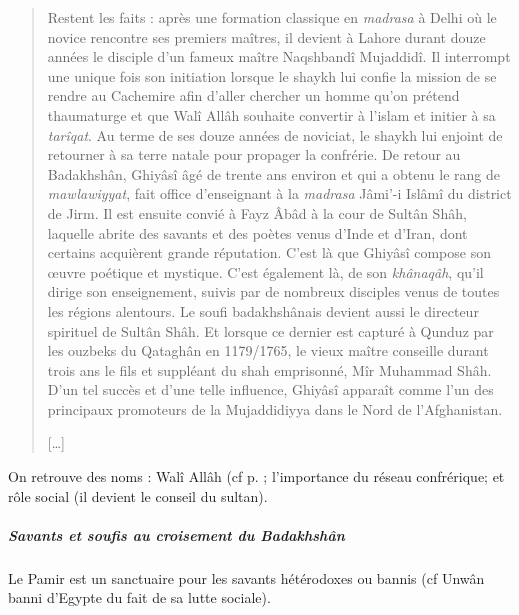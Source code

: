 \begin{quote}
 
Restent les faits : après une formation classique en \emph{madrasa} à
Delhi où le novice rencontre ses premiers maîtres, il devient à Lahore
durant douze années le disciple d'un fameux maître Naqshbandî Mujaddidî.
Il interrompt une unique fois son initiation lorsque le shaykh lui
confie la mission de se rendre au Cachemire afin d'aller chercher un
homme qu'on prétend thaumaturge et que Walî Allâh souhaite convertir à
l'islam et initier à sa \emph{tarîqat}. Au terme de ses douze années de
noviciat, le shaykh lui enjoint de retourner à sa terre natale pour
propager la confrérie. De retour au Badakhshân, Ghiyâsî âgé de trente
ans environ et qui a obtenu le rang de \emph{mawlawiyyat}, fait office
d'enseignant à la \emph{madrasa} Jâmi'-i Islâmî du district de Jirm. Il
est ensuite convié à Fayz Âbâd à la cour de Sultân Shâh, laquelle abrite
des savants et des poètes venus d'Inde et d'Iran, dont certains
acquièrent grande réputation. C'est là que Ghiyâsî compose son œuvre
poétique et mystique. C'est également là, de son \emph{khânaqâh}, qu'il
dirige son enseignement, suivis par de nombreux disciples venus de
toutes les régions alentours. Le soufi badakhshânais devient aussi le
directeur spirituel de Sultân Shâh. Et lorsque ce dernier est capturé à
Qunduz par les ouzbeks du Qataghân en 1179/1765, le vieux maître
conseille durant trois ans le fils et suppléant du shah emprisonné, Mîr
Muhammad Shâh. D'un tel succès et d'une telle influence, Ghiyâsî
apparaît comme l'un des principaux promoteurs de la Mujaddidiyya dans le
Nord de l'Afghanistan.

{[}\ldots{]}
\end{quote}

\begin{Prop}
On retrouve des noms : Walî Allâh (cf p. \pageref{Theo:waliAllah}; l'importance du réseau confrérique; et rôle social (il devient le conseil du sultan).
\end{Prop}

\subparagraph{Savants et soufis au croisement du
Badakhshân}
Le Pamir est un sanctuaire pour les savants hétérodoxes ou bannis (cf Unwân banni d'Egypte du fait de sa lutte sociale).

